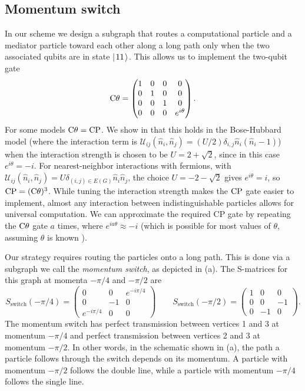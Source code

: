 \documentclass[../thesis-main/thesis-main]{subfiles}
\begin{document}
\subsection{Momentum switch}

In our scheme we design a subgraph that routes a computational particle and a mediator particle toward each other along a long path only when the two associated qubits are in state $|\mspace{2mu} 11 \mspace{2mu} \rangle$. This allows us to implement the two-qubit gate
\[
\mathrm{C}\theta=
\begin{pmatrix}
1 & 0 & 0 & 0\\
0 & 1 & 0 & 0\\
0 & 0 & 1 &0\\
0 & 0 & 0 & e^{i\theta}\\
\end{pmatrix}.
\]
For some models $\mathrm{C}\theta =\mathrm{CP}$. We show in  that this holds in the Bose-Hubbard model (where the interaction term is  $\mathcal{U}_{ij}(\hat{n}_i,\hat{n}_j)=  (U/2) \delta_{i,j} \hat{n}_i(\hat{n}_i-1)$) when the interaction strength is chosen to be $U=2+\sqrt{2}$, since in this case $e^{i\theta}=-i$. For nearest-neighbor interactions with fermions, with $\mathcal{U}_{ij}(\hat{n}_i,\hat{n}_j) = U \delta_{(i,j) \in E(G)} \hat{n}_i \hat{n}_j$, the choice $U=-2-\sqrt{2}$ gives $e^{i\theta}=i$, so $\mathrm{CP}=(\mathrm{C}\theta)^3$. While tuning the interaction strength makes the $\mathrm{CP}$ gate easier to implement, almost any interaction between indistinguishable particles allows for universal computation. We can approximate the required CP gate by repeating the $\mathrm{C}\theta$  gate $a$ times, where $e^{i a \theta} \approx -i$ (which is possible for most values of $\theta$, assuming $\theta$ is known \cite{note2}). 

Our strategy requires routing the particles onto a long path.  This is done via a subgraph we call the \emph{momentum switch}, as depicted in (a). The S-matrices for this graph at momenta $-{\pi}/{4}$ and $-{\pi}/{2}$ are
\begin{equation}
  S_{\text{switch}}\left(-\pi/4\right) = \begin{pmatrix} 0 & 0 & e^{-i\pi/4}\\
    0 & -1 & 0\\
    e^{-i\pi/4} & 0 & 0\end{pmatrix}\qquad
  S_{\text{switch}}\left(-\pi/2\right) = \begin{pmatrix}1 & 0 &0\\
    0 & 0 & -1\\
    0 & -1 & 0\end{pmatrix}.
\label{eq:switch_S}
\end{equation}
 The momentum switch has perfect transmission between vertices 1 and 3 at momentum $-{\pi}/{4}$ and perfect transmission between vertices 2 and 3 at momentum $-{\pi}/{2}$. In other words, in the schematic shown in (a), the path a particle follows through the switch depends on its momentum. A particle with momentum $-{\pi}/{2}$ follows the double line, while a particle with momentum $-{\pi}/{4}$ follows the single line.
\end{document}
